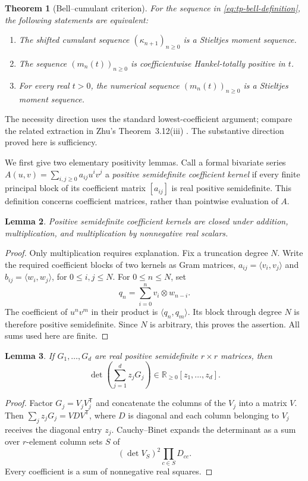 \documentclass[11pt,a4paper]{article}
\newtheorem{theorem}{Theorem}[section]
\newtheorem{lemma}[theorem]{Lemma}
\theoremstyle{definition}
\theoremstyle{remark}
\numberwithin{equation}{section}
\begin{document}
\begin{theorem}[Bell--cumulant criterion]
\label{thm:tp-bell}
For the sequence in \eqref{eq:tp-bell-definition}, the following statements
are equivalent:
\begin{enumerate}
 \item The shifted cumulant sequence $(\kappa_{n+1})_{n\geq0}$ is a
 Stieltjes moment sequence.
 \item The sequence $(m_n(t))_{n\geq0}$ is coefficientwise
 Hankel-totally positive in $t$.
 \item For every real $t>0$, the numerical sequence
 $(m_n(t))_{n\geq0}$ is a Stieltjes moment sequence.
\end{enumerate}
\end{theorem}

The necessity direction uses the standard lowest-coefficient argument;
compare the related extraction in Zhu's Theorem~3.12(iii)
\cite{Zhu2021}. The substantive direction proved here is sufficiency.

We first give two elementary positivity lemmas.  Call a formal bivariate
series $A(u,v)=\sum_{i,j\geq0}a_{ij}u^iv^j$ a
\emph{positive semidefinite coefficient kernel} if every finite principal
block of its coefficient matrix $[a_{ij}]$ is real positive semidefinite.
This definition concerns coefficient matrices, rather than pointwise
evaluation of $A$.

\begin{lemma}
\label{lem:tp-kernel}
Positive semidefinite coefficient kernels are closed under addition,
multiplication, and multiplication by nonnegative real scalars.
\end{lemma}
\begin{proof}
Only multiplication requires explanation.  Fix a truncation degree $N$.
Write the required coefficient blocks of two kernels as Gram matrices,
$a_{ij}=\langle v_i,v_j\rangle$ and
$b_{ij}=\langle w_i,w_j\rangle$, for $0\leq i,j\leq N$.
For $0\leq n\leq N$, set
\[
 q_n=\sum_{i=0}^n v_i\otimes w_{n-i}.
\]
The coefficient of $u^nv^m$ in their product is
$\langle q_n,q_m\rangle$.  Its block through degree $N$ is therefore
positive semidefinite.  Since $N$ is arbitrary, this proves the assertion.
All sums used here are finite.
\end{proof}

\begin{lemma}
\label{lem:tp-mixed-determinant}
If $G_1,\ldots,G_d$ are real positive semidefinite $r\times r$ matrices,
then
\[
 \det\!\left(\sum_{j=1}^d z_jG_j\right)
 \in\mathbb R_{\geq0}[z_1,\ldots,z_d].
\]
\end{lemma}
\begin{proof}
Factor $G_j=V_jV_j^{\mathsf T}$ and concatenate the columns of the
$V_j$ into a matrix $V$.  Then $\sum_jz_jG_j=VDV^{\mathsf T}$, where
$D$ is diagonal and each column belonging to $V_j$ receives the diagonal
entry $z_j$.  Cauchy--Binet expands the determinant as a sum over
$r$-element column sets $S$ of
\[
 (\det V_S)^2\prod_{c\in S}D_{cc}.
\]
Every coefficient is a sum of nonnegative real squares.
\end{proof}
\end{document}
